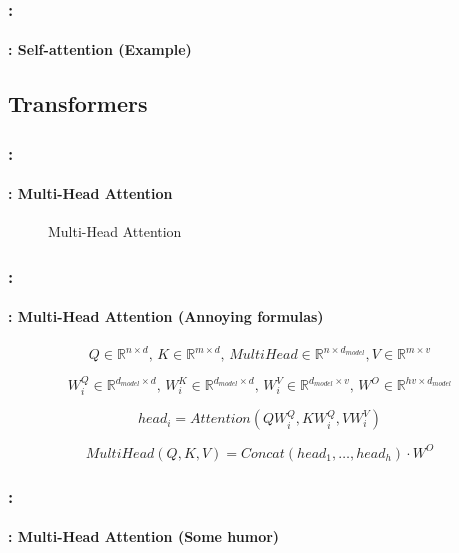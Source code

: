 \documentclass[xcolor=table]{beamer}
\begin{document}
\begin{frame}
	\frametitle{\insertshortsubtitle: \insertsection}
	\framesubtitle{\insertsubsection: Self-attention (Example)}
	
	\begin{center}
	\end{center}
	
\end{frame}


\subsection{Transformers}

\begin{frame}
	\frametitle{\insertshortsubtitle: \insertsection}
	\framesubtitle{\insertsubsection: Multi-Head Attention}
	
	
	\begin{figure}
		\centering
		
		\caption{Multi-Head Attention \cite{2017-vaswani-al}}
	\end{figure}

\end{frame}

\begin{frame}
	\frametitle{\insertshortsubtitle: \insertsection}
	\framesubtitle{\insertsubsection: Multi-Head Attention (Annoying formulas)}
	
	\[Q \in \mathbb{R}^{n \times d}, \, K \in \mathbb{R}^{m \times d}, \, MultiHead \in \mathbb{R}^{n \times d_{model}}, V \in \mathbb{R}^{m \times v} \]
	
	\[W^Q_i \in \mathbb{R}^{d_{model} \times d}, \,  W^K_i \in \mathbb{R}^{d_{model} \times d}, \, W^V_i \in \mathbb{R}^{d_{model} \times v}, \, W^O \in \mathbb{R}^{hv \times d_{model}}\]
	
	\[head_i = Attention(Q W^Q_i, K W^Q_i, V W^V_i)\]
	
	\[MultiHead(Q, K, V) = Concat(head_1, \ldots, head_h) \cdot W^O\]
	
\end{frame}


\begin{frame}
	\frametitle{\insertshortsubtitle: \insertsection}
	\framesubtitle{\insertsubsection: Multi-Head Attention (Some humor)}
	
	
\end{frame}
\end{document}
